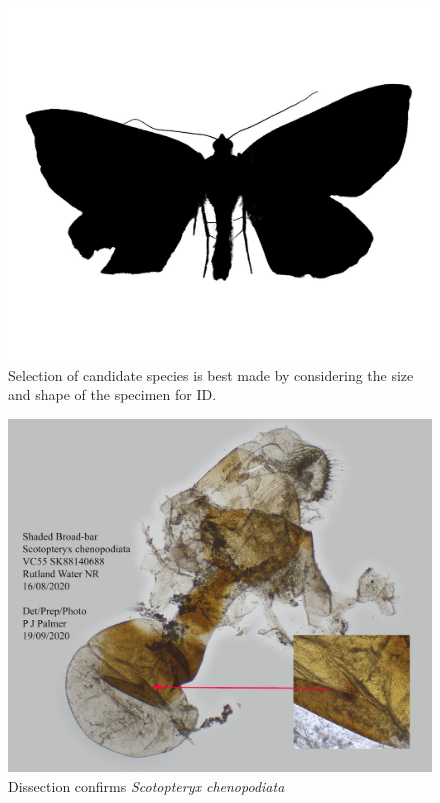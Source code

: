 \documentclass[]{article}
\begin{document}
\begin{figure}
	\centering
	\includegraphics[width=0.7\linewidth]{S202012271445-silhouette.jpg}
	\caption{Selection of candidate species is best made by considering the size and shape of the specimen for ID.}
	\label{fig:s202012271445-silhouette}
\end{figure}

\begin{figure}
	\centering
	\includegraphics[width=0.7\linewidth]{202009131026PJP-3}
	\caption{Dissection confirms \textit{Scotopteryx chenopodiata}}
	\label{fig:202009131026pjp-3}
\end{figure}


%

\clearpage
%
\printbibliography
\end{document}
